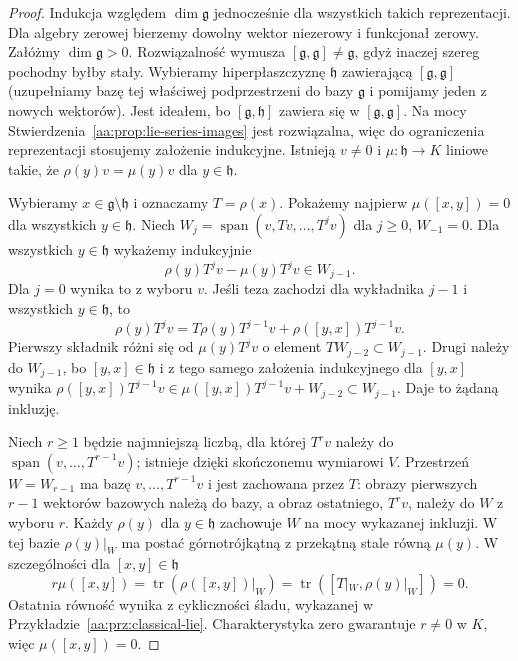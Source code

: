 \begin{proof}
Indukcja względem $\dim\mathfrak g$ jednocześnie
dla wszystkich takich reprezentacji. Dla algebry
zerowej bierzemy dowolny wektor niezerowy i funkcjonał
zerowy. Załóżmy $\dim\mathfrak g>0$.
Rozwiązalność wymusza $[\mathfrak g,\mathfrak g]
\ne\mathfrak g$, gdyż inaczej szereg pochodny
byłby stały. Wybieramy hiperpłaszczyznę $\mathfrak h$
zawierającą $[\mathfrak g,\mathfrak g]$ (uzupełniamy
bazę tej właściwej podprzestrzeni do bazy $\mathfrak g$
i pomijamy jeden z nowych wektorów).
Jest ideałem, bo $[\mathfrak g,\mathfrak h]$
zawiera się w $[\mathfrak g,\mathfrak g]$.
Na mocy Stwierdzenia~\ref{aa:prop:lie-series-images}
jest rozwiązalna, więc do ograniczenia reprezentacji
stosujemy założenie indukcyjne.
Istnieją $v\ne0$ i $\mu:\mathfrak h\to K$ liniowe
takie, że $\rho(y)v=\mu(y)v$ dla $y\in\mathfrak h$.

Wybieramy $x\in\mathfrak g\setminus\mathfrak h$
i oznaczamy $T=\rho(x)$. Pokażemy najpierw
$\mu([x,y])=0$ dla wszystkich $y\in\mathfrak h$.
Niech $W_j=\operatorname{span}(v,Tv,\ldots,T^jv)$
dla $j\ge0$, $W_{-1}=0$.
Dla wszystkich $y\in\mathfrak h$ wykażemy indukcyjnie
\[
 \rho(y)T^jv-\mu(y)T^jv\in W_{j-1}.
\]
Dla $j=0$ wynika to z wyboru $v$. Jeśli teza zachodzi
dla wykładnika $j-1$ i wszystkich $y\in\mathfrak h$,
to
\[
 \rho(y)T^jv=T\rho(y)T^{j-1}v+\rho([y,x])T^{j-1}v.
\]
Pierwszy składnik różni się od $\mu(y)T^jv$
o element $TW_{j-2}\subset W_{j-1}$.
Drugi należy do $W_{j-1}$, bo $[y,x]\in\mathfrak h$
i z tego samego założenia indukcyjnego dla $[y,x]$
wynika $\rho([y,x])T^{j-1}v\in
\mu([y,x])T^{j-1}v+W_{j-2}\subset W_{j-1}$.
Daje to żądaną inkluzję.

Niech $r\ge1$ będzie najmniejszą liczbą, dla której
$T^rv$ należy do $\operatorname{span}(v,\ldots,T^{r-1}v)$;
istnieje dzięki skończonemu wymiarowi $V$.
Przestrzeń $W=W_{r-1}$ ma bazę $v,\ldots,T^{r-1}v$
i jest zachowana przez $T$: obrazy pierwszych $r-1$
wektorów bazowych należą do bazy, a obraz ostatniego,
$T^rv$, należy do $W$ z wyboru $r$.
Każdy $\rho(y)$ dla $y\in\mathfrak h$ zachowuje $W$
na mocy wykazanej inkluzji.
W tej bazie $\rho(y)|_W$ ma postać górnotrójkątną
z przekątną stale równą $\mu(y)$.
W szczególności dla $[x,y]\in\mathfrak h$
\[
 r\mu([x,y])=\operatorname{tr}(\rho([x,y])|_W)
 =\operatorname{tr}([T|_W,\rho(y)|_W])=0.
\]
Ostatnia równość wynika z cykliczności śladu,
wykazanej w Przykładzie~\ref{aa:prz:classical-lie}.
Charakterystyka zero gwarantuje $r\ne0$ w $K$,
więc $\mu([x,y])=0$.


\end{proof}
